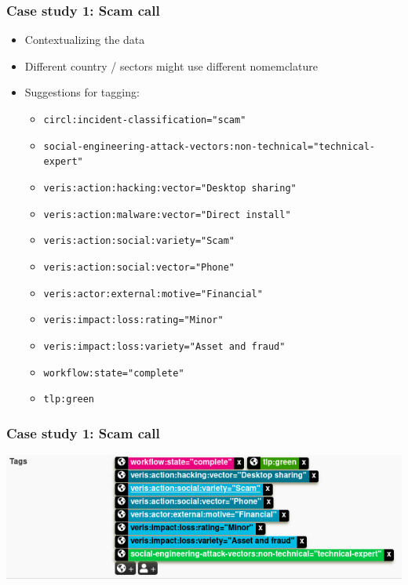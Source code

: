 \begin{frame}
    \frametitle{Case study 1: Scam call}
    \begin{itemize}
        \item Contextualizing the data
        \item Different country / sectors might use different nomemclature
        \item Suggestions for tagging:
        \begin{itemize}
            \item \texttt{circl:incident-classification="scam"}
            \item \texttt{\tiny social-engineering-attack-vectors:non-technical="technical-expert"}
            \item \texttt{veris:action:hacking:vector="Desktop sharing"}
            \item \texttt{veris:action:malware:vector="Direct install"}
            \item \texttt{veris:action:social:variety="Scam"}
            \item \texttt{veris:action:social:vector="Phone"}
            \item \texttt{veris:actor:external:motive="Financial"}
            \item \texttt{veris:impact:loss:rating="Minor"}
            \item \texttt{veris:impact:loss:variety="Asset and fraud"}
            \item \texttt{workflow:state="complete"}
            \item \texttt{tlp:green}
        \end{itemize}
    \end{itemize}
\end{frame}

\begin{frame}
    \frametitle{Case study 1: Scam call}
    \includegraphics[width=1.0\linewidth]{pictures/case1/event-tags.png}
\end{frame}

